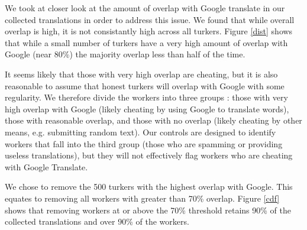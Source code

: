 \documentclass[11pt]{article}
\begin{document}
We took at closer look at the amount of overlap with Google translate in our collected translations in order to address this issue. We found that while overall overlap is high, it is not consistantly high across all turkers. Figure \ref{dist} shows that while a small number of turkers have a very high amount of overlap with Google (near 80\%) the majority overlap less than half of the time. 





It seems likely that those with very high overlap are cheating, but it is also reasonable to assume that honest turkers will overlap with Google with some regularity. We therefore divide the workers into three groups : those with very high overlap with Google (likely cheating by using Google to translate words), those with reasonable overlap, and those with no overlap (likely cheating by other means, e.g. submitting random text). Our controls are designed to identify workers that fall into the third group (those who are spamming or providing useless translations), but they will not effectively flag workers who are cheating with Google Translate. 



We chose to remove the 500 turkers with the highest overlap with Google. This equates to removing all workers with greater than 70\% overlap. Figure \ref{cdf} shows that removing workers at or above the 70\% threshold retains 90\% of the collected translations and over 90\% of the workers.
\end{document}
